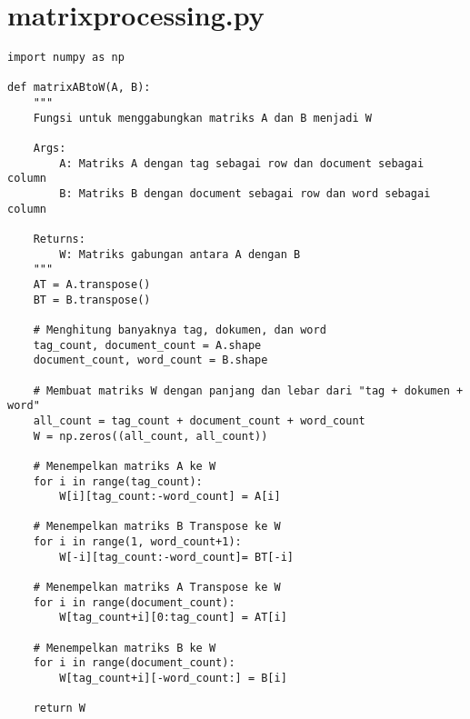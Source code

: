 \chapter{matrix\textunderscore processing.py}
\begin{lstlisting}[breaklines=true]
import numpy as np

def matrixABtoW(A, B):
	"""
	Fungsi untuk menggabungkan matriks A dan B menjadi W

	Args:
		A: Matriks A dengan tag sebagai row dan document sebagai column
		B: Matriks B dengan document sebagai row dan word sebagai column

	Returns:
		W: Matriks gabungan antara A dengan B
	"""
	AT = A.transpose()
	BT = B.transpose()

	# Menghitung banyaknya tag, dokumen, dan word
	tag_count, document_count = A.shape
	document_count, word_count = B.shape

	# Membuat matriks W dengan panjang dan lebar dari "tag + dokumen + word"
	all_count = tag_count + document_count + word_count
	W = np.zeros((all_count, all_count))

	# Menempelkan matriks A ke W
	for i in range(tag_count):
		W[i][tag_count:-word_count] = A[i]

	# Menempelkan matriks B Transpose ke W
	for i in range(1, word_count+1):
		W[-i][tag_count:-word_count]= BT[-i]

	# Menempelkan matriks A Transpose ke W
	for i in range(document_count):
		W[tag_count+i][0:tag_count] = AT[i]
			
	# Menempelkan matriks B ke W
	for i in range(document_count):
		W[tag_count+i][-word_count:] = B[i]
	
	return W
\end{lstlisting}

